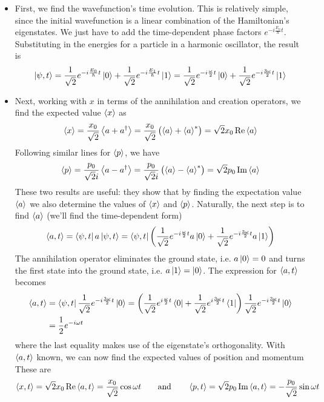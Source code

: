 \documentclass[11pt, a4paper]{article}
\newcommand{\eqtext}[1]{\qquad \text{#1} \qquad}
\begin{document}
\begin{itemize}
	\item First, we find the wavefunction's time evolution. This is relatively simple, since the initial wavefunction is a linear combination of the Hamiltonian's eigenstates. We just have to add the time-dependent phase factors $ e^{-i\frac{E_{n}}{\hbar}t} $. Substituting in the energies for a particle in a harmonic oscillator, the result is
	\begin{equation*}
		\ket{\psi, t} = \frac{1}{\sqrt{2}} e^{-i\frac{E_{0}}{\hbar}t}\ket{0} + \frac{1}{\sqrt{2}} e^{-i\frac{E_{1}}{\hbar}t}\ket{1}  =  \frac{1}{\sqrt{2}} e^{-i\frac{\omega}{2}t}\ket{0} + \frac{1}{\sqrt{2}} e^{-i\frac{3\omega}{2}t}\ket{1}
	\end{equation*}
	
	\item Next, working with $ x $ in terms of the annihilation and creation operators, we find the expected value $ \ev{x} $ as
	\begin{equation*}
		\ev{x} = \frac{x_{0}}{\sqrt{2}}\ev{a + a^{\dagger}} = \frac{x_{0}}{\sqrt{2}}\left(\ev{a} + \ev{a}^{*}\right) =  \sqrt{2}x_{0} \Re \ev{a}
	\end{equation*}
	Following similar lines for $ \ev{p} $, we have
	\begin{equation*}
		\ev{p} = \frac{p_{0}}{\sqrt{2}i}\ev{a - a^{\dagger}} = \frac{p_{0}}{\sqrt{2}i}\left(\ev{a} - \ev{a}^{*}\right) = \sqrt{2}p_{0}\Im \ev{a}
	\end{equation*}
	These two results are useful: they show that by finding the expectation value $ \ev{a} $ we also determine the values of $ \ev{x} $ and $ \ev{p} $. Naturally, the next step is to find $ \ev{a} $ (we'll find the time-dependent form)
	\begin{equation*}
		\ev{a, t} = \bra{\psi, t}a\ket{\psi, t} = \bra{\psi, t}\left(\frac{1}{\sqrt{2}}e^{-i\frac{\omega}{2}t}a \ket{0} + \frac{1}{\sqrt{2}}e^{-i\frac{3\omega}{2}t}a \ket{1}\right)
	\end{equation*}
	The annihilation operator eliminates the ground state, i.e. $ a \ket{0} = 0 $ and turns the first state into the ground state, i.e. $ a \ket{1} = \ket{0} $. The expression for $ \ev{a, t} $ becomes
	\begin{align*}
		\ev{a, t} &= \bra{\psi, t}\frac{1}{\sqrt{2}}e^{-i\frac{3\omega}{2}t}\ket{0} = \left(\frac{1}{\sqrt{2}}e^{i\frac{\omega}{2}t}\bra{0} + \frac{1}{\sqrt{2}}e^{i\frac{3\omega}{2}t}\bra{1}\right) \frac{1}{\sqrt{2}}e^{-i\frac{3\omega}{2}t}\ket{0}\\
		&=\frac{1}{2}e^{-i\omega t} 
	\end{align*}
	where the last equality makes use of the eigenstate's orthogonality. With $ \ev{a, t} $ known, we can now find the expected values of position and momentum These are
	\begin{equation*}
		\ev{x, t} = \sqrt{2}x_{0}\Re\ev{a, t} = \frac{x_{0}}{\sqrt{2}}\cos \omega t \eqtext{and} \ev{p, t} = \sqrt{2}p_{0}\Im\ev{a, t} = - \frac{p_{0}}{\sqrt{2}}\sin \omega t
	\end{equation*}
	

\end{itemize}
\end{document}
